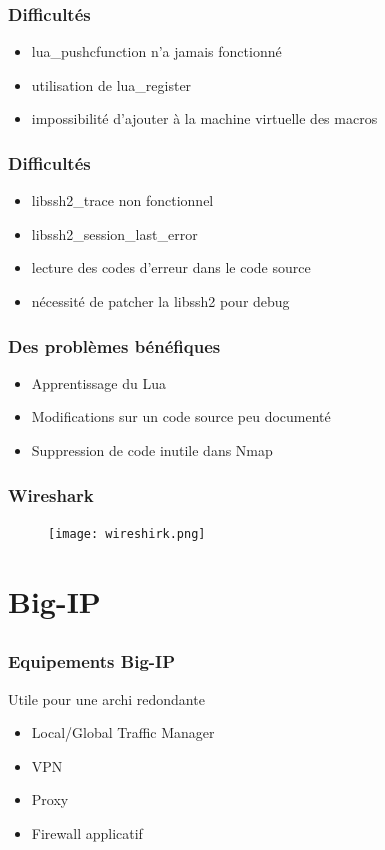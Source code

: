 \documentclass{beamer}
\begin{document}
\begin{frame}
\frametitle{Difficultés}
\begin{itemize}
 \item lua\_pushcfunction n'a jamais fonctionné
 \item utilisation de lua\_register
 \item impossibilité d'ajouter à la machine virtuelle des macros
 \end{itemize}
\end{frame}
\begin{frame}
\frametitle{Difficultés}
\begin{itemize}
\item libssh2\_trace non fonctionnel
\item libssh2\_session\_last\_error
\item lecture des codes d'erreur dans le code source
\item nécessité de patcher la libssh2 pour debug
\end{itemize}
\end{frame}

\begin{frame}
  \frametitle{Des problèmes bénéfiques}
  \begin{itemize}
  \item Apprentissage du Lua
  \item Modifications sur un code source peu documenté 
  \item Suppression de code inutile dans Nmap 
  \end{itemize}
\end{frame}

\begin{frame}
  \frametitle{Wireshark}
  \begin{figure}
    \hspace*{-1cm}
    \texttt{[image: wireshirk.png]}
  \end{figure}
\end{frame}

\section{Big-IP}
\subsection{ }
\begin{frame}
  \frametitle{Equipements Big-IP}
  Utile pour une archi redondante
  \begin{itemize}
  \item Local/Global Traffic Manager
  \item VPN
  \item Proxy
  \item Firewall applicatif
  \end{itemize}
\end{frame}
\end{document}
